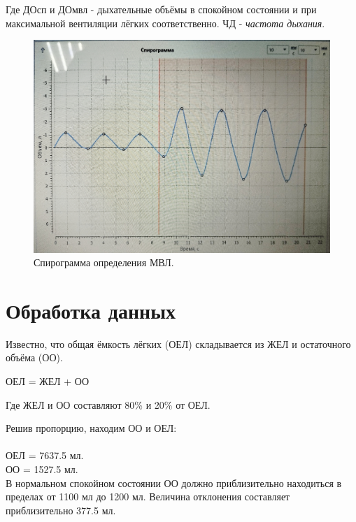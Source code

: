 \documentclass{article}
\begin{document}
            Где ДО{сп} и ДО{мвл} - дыхательные объёмы в спокойном состоянии и при максимальной
            вентиляции лёгких соответственно. ЧД - \textit{частота дыхания}.

            \begin{figure}[h]
                \centering
                \includegraphics*[width=\textwidth]{МВЛ.jpg}
                \caption{Спирограмма определения МВЛ.}
            \end{figure}
        \newpage

    \section*{Обработка данных}

        \hspace*{4mm} Известно, что общая ёмкость лёгких (ОЕЛ) складывается из ЖЕЛ и остаточного объёма (ОО).
        
        \begin{center}
            ОЕЛ = ЖЕЛ + ОО
        \end{center}

        Где ЖЕЛ и ОО составляют 80\% и 20\% от ОЕЛ.
        \vspace*{4mm}

        Решив пропорцию, находим ОО и ОЕЛ:\\
        \\
        ОЕЛ = 7637.5 мл. \\
        ОО = 1527.5 мл. \\

        В нормальном спокойном состоянии ОО должно приблизительно находиться
        в пределах от 1100 мл до 1200 мл. Величина отклонения составляет приблизительно
        377.5 мл.
        \vspace*{4mm}
        \newpage
\end{document}
